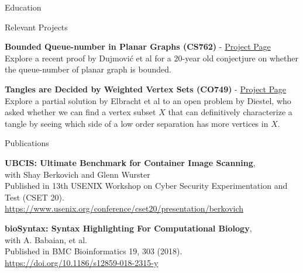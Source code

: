 \documentclass{cv}
\begin{document}
\begin{rSection}{Education}
\begin{rSubsection}{Relevant Projects}{}{}{}	
	\item \textbf{Bounded Queue-number in Planar Graphs (CS762)} - \href{https://jeffreyhykam.com/writings/}{Project Page}\\
	Explore a recent proof by Dujmovi\'{c} et al \cite{queue} for a 20-year old conjectjure on whether the queue-number of planar graph is bounded. \\

	\item \textbf{Tangles are Decided by Weighted Vertex Sets (CO749)} - \href{https://jeffreyhykam.com/writings/}{Project Page}\\
	Explore a partial solution by Elbracht et al \cite{tangle} to an open problem by Diestel, who asked whether we can find a vertex subset $X$ that can definitively characterize a tangle by seeing which side of a low order separation has more vertices in $X$. 
\end{rSubsection}
\end{rSection}

\begin{rSection}{Publications}
\begin{rSubsectionPure}
	\item \textbf{{UBCIS}: Ultimate Benchmark for Container Image Scanning}, \\
	with Shay Berkovich and Glenn Wurster \\
	Published in 13th {USENIX} Workshop on Cyber Security Experimentation and Test ({CSET} 20). \\
	\href{https://www.usenix.org/conference/cset20/presentation/berkovich}{https://www.usenix.org/conference/cset20/presentation/berkovich}
\end{rSubsectionPure}

\begin{rSubsectionPure}
	\item \textbf{bioSyntax: Syntax Highlighting For Computational Biology}, \\
	with A. Babaian, et al. \\
	Published in BMC Bioinformatics 19, 303 (2018). \\
	\href{https://doi.org/10.1186/s12859-018-2315-y}{https://doi.org/10.1186/s12859-018-2315-y}
\end{rSubsectionPure}
\end{rSection}
\end{document}
